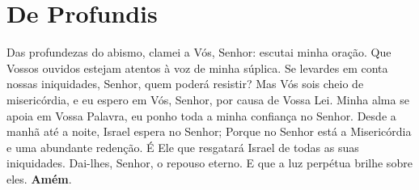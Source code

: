 \section*{De Profundis}
Das profundezas do abismo, clamei a Vós, Senhor: escutai minha oração.
Que Vossos ouvidos estejam atentos à voz de minha súplica.
Se levardes em conta nossas iniquidades, Senhor, quem poderá resistir?
Mas Vós sois cheio de misericórdia, e eu espero em Vós, Senhor, por causa de Vossa Lei.
Minha alma se apoia em Vossa Palavra, eu ponho toda a minha confiança no Senhor.
Desde a manhã até a noite, Israel espera no Senhor;
Porque no Senhor está a Misericórdia e uma abundante redenção.
É Ele que resgatará Israel de todas as suas iniquidades.
Dai-lhes, Senhor, o repouso eterno.
E que a luz perpétua brilhe sobre eles.
\textbf{Amém}.